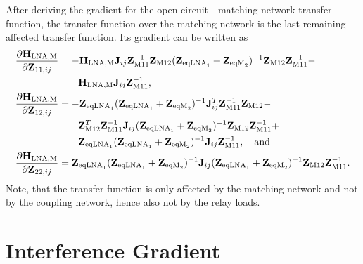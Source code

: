 After deriving the gradient for the open circuit - matching network transfer function, the transfer function over the matching network is the last remaining affected transfer function.
Its gradient can be written as
\begin{align}
\label{eq:HLNAM_sig_grad}
\nonumber
\frac{\partial\mathbf{H}_\text{LNA,M}}{\partial\mathbf{Z}_{11,ij}}&=
	-\mathbf{H}_\text{LNA,M}\mathbf{J}_{ij}\mathbf{Z}_\text{M11}^{-1}\mathbf{Z}_\text{M12}
	(\mathbf{Z}_{\text{eqLNA}_1} + \mathbf{Z}_{\text{eqM}_2})^{-1}
	\mathbf{Z}_\text{M12}\mathbf{Z}_\text{M11}^{-1} -\\
&\qquad	\mathbf{H}_\text{LNA,M}\mathbf{J}_{ij}\mathbf{Z}_\text{M11}^{-1},\\\nonumber
\frac{\partial\mathbf{H}_\text{LNA,M}}{\partial\mathbf{Z}_{12,ij}}&=
	-\mathbf{Z}_{\text{eqLNA}_1}(\mathbf{Z}_{\text{eqLNA}_1} + \mathbf{Z}_{\text{eqM}_2})^{-1}
	\mathbf{J}_{ij}^T\mathbf{Z}_\text{M11}^{-1}\mathbf{Z}_\text{M12} - \\\nonumber
&\qquad	\mathbf{Z}_\text{M12}^T\mathbf{Z}_\text{M11}^{-1}\mathbf{J}_{ij}
	(\mathbf{Z}_{\text{eqLNA}_1} + \mathbf{Z}_{\text{eqM}_2})^{-1}
	\mathbf{Z}_\text{M12}\mathbf{Z}_\text{M11}^{-1} + \\
&\qquad	\mathbf{Z}_{\text{eqLNA}_1}(\mathbf{Z}_{\text{eqLNA}_1} + \mathbf{Z}_{\text{eqM}_2})^{-1}
	\mathbf{J}_{ij}\mathbf{Z}_\text{M11}^{-1},\quad\text{and}\\
\frac{\partial\mathbf{H}_\text{LNA,M}}{\partial\mathbf{Z}_{22,ij}}&=
	\mathbf{Z}_{\text{eqLNA}_1}(\mathbf{Z}_{\text{eqLNA}_1} + \mathbf{Z}_{\text{eqM}_2})^{-1}
	\mathbf{J}_{ij}(\mathbf{Z}_{\text{eqLNA}_1} + \mathbf{Z}_{\text{eqM}_2})^{-1}
	\mathbf{Z}_\text{M12}\mathbf{Z}_\text{M11}^{-1}.
\label{eq:HLNAM_sig_grad_22}
\end{align}
Note, that the transfer function is only affected by the matching network and not by the coupling network, hence also not by the relay loads.

\section{Interference Gradient}
\label{sec:interf_gradient}

